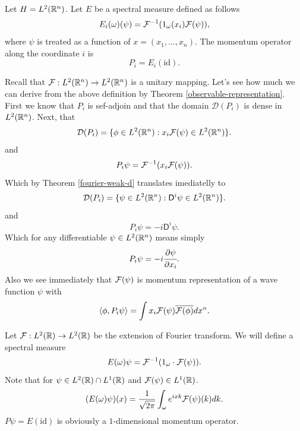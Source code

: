 \documentclass[main.tex]{subfiles}
\begin{document}
\begin{definition}
Let $H=L^2(\mathbb{R}^n)$. Let $E$ be a spectral measure defined as follows
\begin{equation}
E_{i}(\omega)(\psi) = \mathcal{F}^{-1}(1_{\omega}(x_i)\mathcal{F}(\psi)),
\end{equation}
where $\psi$ is treated as a function of $x=(x_1,\dots, x_n)$.
The momentum operator along the coordinate $i$ is
\begin{equation}
P_i = E_i(\text{id}).
\end{equation}  
\end{definition}
Recall that $\mathcal{F}:L^2(\mathbb{R}^n)\to L^2(\mathbb{R}^n)$ is a unitary mapping.
Let's see how much we can derive from the above definition by Theorem \ref{observable-representation}. First we know that $P_i$ is sef-adjoin and that the domain $\mathcal{D}(P_i)$ is dense in $L^2(\mathbb{R}^n)$. Next, that
\begin{equation}
\mathcal{D}(P_i) = \{\phi \in L^2(\mathbb{R}^n) : x_i\mathcal{F}(\psi)\in  L^2(\mathbb{R}^n)\}.
\end{equation} 
and
\begin{equation}
P_i\psi = \mathcal{F}^{-1}(x_i\mathcal{F}(\psi)).
\end{equation}
Which by Theorem \ref{fourier-weak-d} translates imediatelly to
\begin{equation}
\mathcal{D}(P_i) = \{\psi \in L^2(\mathbb{R}^n) : \mathsf{D}^i\psi\in L^2(\mathbb{R}^n)\}.
\end{equation}
and
\begin{equation}
P_i\psi = -i\mathsf{D}^i\psi.
\end{equation}
Which for any differentiable $\psi \in L^2(\mathbb{R}^n)$ means simply
\begin{equation}
P_i\psi = -i\cfrac{\partial \psi}{\partial x_i}.
\end{equation}
Also we see immediately that $\mathcal{F}(\psi)$ is momentum representation of a wave function $\psi$ with
\begin{equation}
\langle  \phi, P_i \psi\rangle = \int x_i \mathcal{F}(\psi)\overline{\mathcal{F}(\phi)} dx^n.
\end{equation}
\begin{example}
Let $\mathcal{F}:L^2(\mathbb{R})\to L^2(\mathbb{R})$ be the extension of Fourier transform. We will define a spectral measure
\begin{equation}
E(\omega)\psi = \mathcal{F}^{-1}(1_\omega \cdot \mathcal{F}(\psi)).
\end{equation}
Note that for $\psi\in L^2(\mathbb{R})\cap L^1(\mathbb{R})$ and $\mathcal{F}(\psi)\in L^1(\mathbb{R})$.
\begin{equation}
(E(\omega)\psi)(x) = \frac{1}{\sqrt{2\pi}}\int_\omega e^{ixk} \mathcal{F}(\psi)(k)dk.
\end{equation}
$P\psi = E(\text{id})$ is obviously a $1$-dimensional momentum operator.
\end{example}
\end{document}

